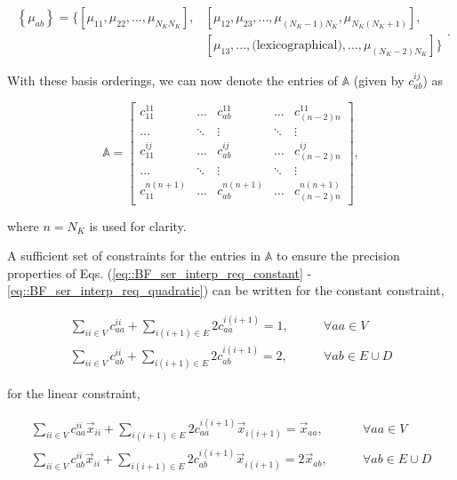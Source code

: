 \documentclass[preprint,10pt]{elsarticle}
\begin{document}
\begin{equation}
\label{eq::BF_quad_ordering}
\begin{aligned}
\left\{ \mu_{ab} \right\} = \Big\{ \left[  \mu_{11}, \mu_{22}, ... , \mu_{N_K N_K} \right] , &\left[ \mu_{12}, \mu_{23}, ..., \mu_{(N_K-1)N_K}, \mu_{N_K(N_K+1)} \right] ,\\ 
&\left[ \mu_{13}, ..., \text{(lexicographical)} ,..., \mu_{(N_K-2)N_K} \right] \Big\} 
\end{aligned} .
\end{equation}

\noindent With these basis orderings, we can now denote the entries of $\mathbb{A}$ (given by $c_{ab}^{ij}$) as

\begin{equation}
\label{eq::BF_quad_to_ser_matrix_constraints}
\mathbb{A} = 
\left[
\begin{array}{ccccc}
c_{11}^{11} & \ldots & c_{ab}^{11} & \ldots & c_{(n-2)n}^{11} \\
\ldots&\ddots&\vdots&\ddots&\vdots \\
c_{11}^{ij} & \ldots & c_{ab}^{ij} & \ldots & c_{(n-2)n}^{ij} \\
\ldots&\ddots&\vdots&\ddots&\vdots \\
c_{11}^{n(n+1)} & \ldots & c_{ab}^{n(n+1)} & \ldots & c_{(n-2)n}^{n(n+1)} 
\end{array}
\right] ,
\end{equation}

\noindent where $n=N_K$ is used for clarity.

A sufficient set of constraints for the entries in $\mathbb{A}$ to ensure the precision properties of Eqs. (\ref{eq::BF_ser_interp_req_constant} - \ref{eq::BF_ser_interp_req_quadratic}) can be written for the constant constraint,

\begin{equation}
\label{eq::BF_Amat_cons_constraints}
\begin{aligned}
\sum_{ii \in V} c_{aa}^{ii} + \sum_{i(i+1) \in E} 2 c_{aa}^{i(i+1)} = 1, &\qquad \forall aa \in V \\
\sum_{ii \in V} c_{ab}^{ii} + \sum_{i(i+1) \in E} 2 c_{ab}^{i(i+1)} = 2, &\qquad \forall ab \in E \cup D
\end{aligned}
\end{equation}

\noindent for the linear constraint,

\begin{equation}
\label{eq::BF_Amat_lin_constraints}
\begin{aligned}
\sum_{ii \in V} c_{aa}^{ii} \vec{x}_{ii} + \sum_{i(i+1) \in E} 2 c_{aa}^{i(i+1)} \vec{x}_{i(i+1)} = \vec{x}_{aa}, &\qquad \forall aa \in V \\
\sum_{ii \in V} c_{ab}^{ii} \vec{x}_{ii} + \sum_{i(i+1) \in E} 2 c_{ab}^{i(i+1)} \vec{x}_{i(i+1)} = 2 \vec{x}_{ab}, &\qquad \forall ab \in E \cup D
\end{aligned}
\end{equation}
\end{document}
